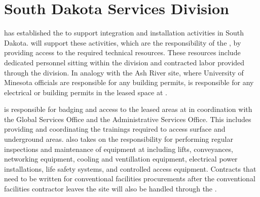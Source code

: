 \section{South Dakota Services Division}
\label{sec:fdsp-coord-host_facility_services}

 has established the  to support integration
and installation activities in South Dakota.  will support
these activities, which are the responsibility of the , by
providing access to the required technical resources.  These resources
include dedicated  personnel sitting within the division
and contracted labor provided through the division.  In analogy with
the Ash River site, where University of Minesota officials are
responsible for any building permits,  is responsible for
any electrical or building permits in the leased space at .

 is responsible for badging and access to the leased areas
at  in coordination with the \fnal Global Services Office
and the  Administrative Services Office. This includes
providing and coordinating the trainings required to access surface
and underground areas.   also takes on the responsibility
for performing regular inspections and maintenance of
 equipment at  including lifts,
conveyances, networking equipment, cooling and ventillation equipment,
electrical power installations, life safety systems, and controlled
access equipment.  Contracts that need to be written for conventional
facilities procurements after the  conventional facilities
contractor leaves the site will also be handled through the
.
